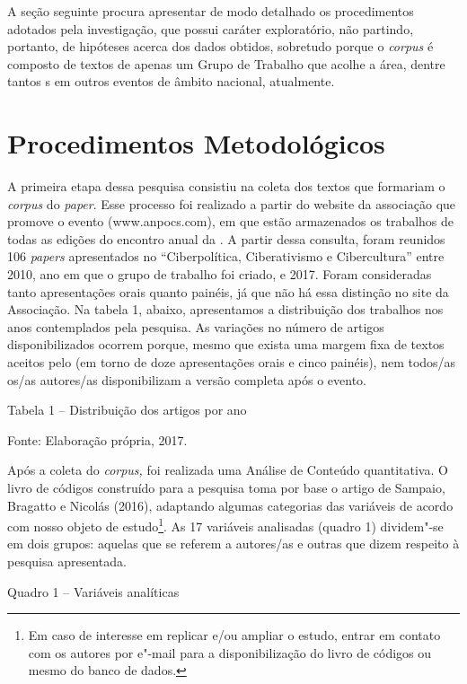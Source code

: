 A seção seguinte procura apresentar de modo detalhado os procedimentos
adotados pela investigação, que possui caráter exploratório, não
partindo, portanto, de hipóteses acerca dos dados obtidos, sobretudo
porque o \emph{corpus} é composto de textos de apenas um Grupo de
Trabalho que acolhe a área, dentre tantos s em outros eventos de
âmbito nacional, atualmente.

\section{Procedimentos Metodológicos}

A primeira etapa dessa pesquisa consistiu na coleta dos textos que
formariam o \emph{corpus} do \emph{paper}. Esse processo foi realizado a
partir do website da associação que promove o evento (www.anpocs.com),
em que estão armazenados os trabalhos de todas as edições do encontro
anual da . A partir dessa consulta, foram reunidos 106
\emph{papers} apresentados no  ``Ciberpolítica, Ciberativismo e
Cibercultura'' entre 2010, ano em que o grupo de trabalho foi criado, e
2017. Foram consideradas tanto apresentações orais quanto painéis, já
que não há essa distinção no site da Associação. Na tabela 1, abaixo,
apresentamos a distribuição dos trabalhos nos anos contemplados pela
pesquisa. As variações no número de artigos disponibilizados ocorrem
porque, mesmo que exista uma margem fixa de textos aceitos pelo  (em
torno de doze apresentações orais e cinco painéis), nem todos/as os/as
autores/as disponibilizam a versão completa após o evento.

Tabela 1 -- Distribuição dos artigos por ano


Fonte: Elaboração própria, 2017.

Após a coleta do \emph{corpus,} foi realizada uma Análise de Conteúdo
quantitativa. O livro de códigos construído para a pesquisa toma por
base o artigo de Sampaio, Bragatto e Nicolás (2016), adaptando algumas
categorias das variáveis de acordo com nosso objeto de estudo\footnote{Em
  caso de interesse em replicar e/ou ampliar o estudo, entrar em contato
  com os autores por e"-mail para a disponibilização do livro de códigos
  ou mesmo do banco de dados.}. As 17 variáveis analisadas (quadro 1)
dividem"-se em dois grupos: aquelas que se referem a autores/as e outras
que dizem respeito à pesquisa apresentada.

Quadro 1 -- Variáveis analíticas



